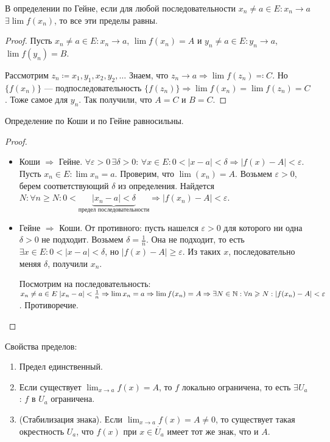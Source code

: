 \begin{property}
    В определении по Гейне, если для любой последовательности $x_n \neq a \in E: x_n \to a$  $\exists \lim f(x_n)$, то все эти пределы равны.
\end{property}
\begin{proof}
    Пусть $x_n \neq a \in E: x_n \to a$, $\lim f(x_n) = A$ и $y_n \neq a \in E:  y_n \to a$,  $\lim f(y_n) = B$.

    Рассмотрим  $z_n \coloneqq x_1, y_1, x_2, y_2,\ldots$ Знаем, что $z_n \to a \Rightarrow \lim f(z_n) \eqqcolon C$. Но $\{f(x_n)\}$ --- подпоследовательность  $\{f(z_n)\} \Rightarrow \lim f(x_n) = \lim f(z_n) = C$. Тоже самое для  $y_n$. Так получили, что $A = C$ и $B = C$.
\end{proof}
\begin{theorem}
    Определение по Коши и по Гейне равносильны.
\end{theorem}
\begin{proof}
    \slashn
    \begin{itemize}
        \item Коши $\Rightarrow$ Гейне. $\forall \varepsilon > 0\, \exists \delta >0: \, \forall x \in E: 0 < |x-a| < \delta \Rightarrow |f(x) - A| < \varepsilon$. Пусть  $x_n \in E: \lim x_n = a$. Проверим, что  $\lim(x_n) = A$. Возьмем $\varepsilon > 0$, берем соответствующий  $\delta$ из определения. Найдется $N: \forall n \ge N: 0 < \underbrace{|x_n-a|<\delta}_{\text{предел последовательности}} \Rightarrow |f(x_n) - A| < \varepsilon$. 
        \item Гейне $\Rightarrow$ Коши. От противного: пусть нашелся  $\varepsilon > 0$ для которого ни одна  $\delta > 0$ не подходит. Возьмем $\delta =\frac{1}{n}$. Она не подходит, то есть $\exists x \in E: 0 < |x-a| < \delta$, но  $|f(x) - A| \ge \varepsilon$. Из таких $x$, последовательно меняя $\delta$, получили $x_n$. 

            Посмотрим на последовательность:  $x_n \neq a \in E\; |x_n-a| < \frac{1}{n} \Rightarrow \lim x_n = a \Rightarrow \lim f(x_n) = A \Rightarrow \exists N \in \mathbb{N} : \forall n \geqslant N: |f(x_n) - A| < \varepsilon$. Противоречие. 
    \end{itemize}
\end{proof}
\slashn
Свойства пределов:
\begin{enumerate}
    \item Предел единственный.
    \item Если существует $\lim_{x\to a} f(x) = A$, то  $f$ локально ограничена, то есть $\exists U_a$ : $f$ в $U_a$ ограничена.
    \item (Стабилизация знака). Если  $\lim_{x\to a} f(x) = A \neq 0$, то существует такая окрестность  $U_a$, что  $f(x)$ при  $x \in \dot{U_a}$ имеет тот же знак, что и  $A$.
\end{enumerate}
